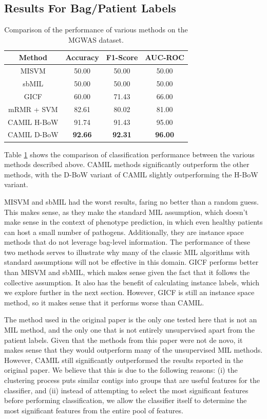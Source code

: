 

\subsection{Results For Bag/Patient Labels}

\begin{table}[h]
\begin{center}
\caption{Comparison of the performance of various methods on the MGWAS dataset. 
\label{tab:comp}}
\begin{tabular}{|c|ccc|}\hline
Method & Accuracy & F1-Score & AUC-ROC\\\hline
MISVM & 50.00 & 50.00 & 50.00\\\hline
sbMIL & 50.00 & 50.00 & 50.00\\\hline
GICF & 60.00 & 71.43 & 66.00\\\hline
mRMR + SVM & 82.61 & 80.02 & 81.00\\\hline 
CAMIL H-BoW & 91.74 & 91.43 & 95.00\\\hline
CAMIL D-BoW & \bf{92.66} & \bf{92.31} & \bf{96.00}\\\hline
\end{tabular}
\end{center}
\end{table}

Table \ref{tab:comp} shows the comparison of classification performance between the various methods described above. CAMIL methods significantly outperform the other methods, with the D-BoW variant of CAMIL slightly outperforming the H-BoW variant. 

MISVM and sbMIL had the worst results, faring no better than a random guess. This makes sense, as they make the standard MIL assumption, which doesn't make sense in the context of phenotype prediction, in which even healthy patients can host a small number of pathogens. Additionally, they are instance space methods that do not leverage bag-level information. The performance of these two methods serves to illustrate why many of the classic MIL algorithms with standard assumptions will not be effective in this domain. GICF performs better than MISVM and sbMIL, which makes sense given the fact that it follows the collective assumption. It also has the benefit of calculating instance labels, which we explore further in the next section. However, GICF is still an instance space method, so it makes sense that it performs worse than CAMIL.

The method used in the original paper is the only one tested here that is not an MIL method, and the only one that is not entirely unsupervised apart from the patient labels. Given that the methods from this paper were not de novo, it makes sense that they would outperform many of the unsupervised MIL methods. However, CAMIL still significantly outperformed the results reported in the original paper. We believe that this is due to the following reasons: (i) the clustering process puts similar contigs into groups that are useful features for the classifier, and (ii) instead of attempting to select the most significant features before performing classification, we allow the classifier itself to determine the most significant features from the entire pool of features.

